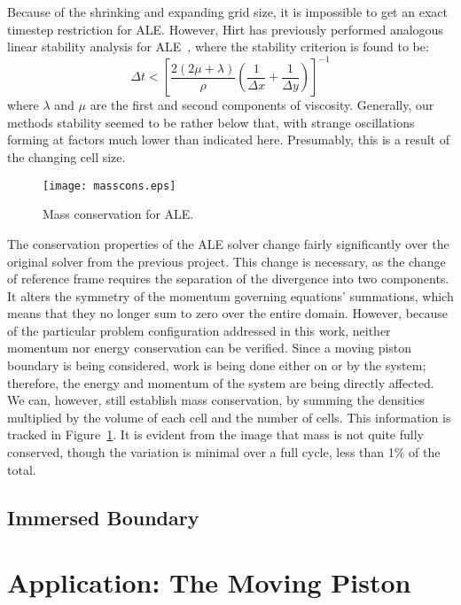 \documentclass{article}
\begin{document}
Because of the shrinking and expanding grid size, it is impossible to get an exact timestep restriction for ALE.  However, Hirt has previously performed analogous linear stability analysis for ALE~\cite{hirt74}, where the stability criterion is found to be:
\begin{equation}
  \Delta t < \left[ \frac{2(2\mu + \lambda)}{\rho}\left(\frac{1}{\Delta x} + \frac{1}{\Delta y}\right)\right]^{-1}
\end{equation}
where $\lambda$ and $\mu$ are the first and second components of viscosity.  Generally, our methods stability seemed to be rather below that, with strange oscillations forming at factors much lower than indicated here.  Presumably, this is a result of the changing cell size.  
\begin{figure}
  \centering
  \texttt{[image: masscons.eps]}         
  \caption{Mass conservation for ALE.}
  \label{fig:masscons}
\end{figure}
The conservation properties of the ALE solver change fairly significantly over the original solver from the previous project.  This change is necessary, as the change of reference frame requires the separation of the divergence into two components.  It alters the symmetry of the momentum governing equations' summations, which means that they no longer sum to zero over the entire domain.  However, because of the particular problem configuration addressed in this work, neither momentum nor energy conservation can be verified.  Since a moving piston boundary is being considered, work is being done either on or by the system; therefore, the energy and momentum of the system are being directly affected.  We can, however, still establish mass conservation, by summing the densities multiplied by the volume of each cell and the number of cells.  This information is tracked in Figure~\ref{fig:masscons}.  It is evident from the image that mass is not quite fully conserved, though the variation is minimal over a full cycle, less than 1\% of the total.  

\subsection{Immersed Boundary}



\section{Application: The Moving Piston}
\end{document}
